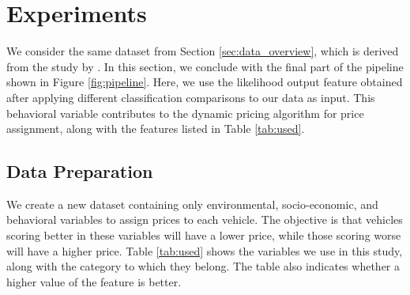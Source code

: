 \documentclass[12pt]{book}
\begin{document}


\section{Experiments}

We consider the same dataset from Section \ref{sec:data_overview}, which is derived from the study by \cite{duran_lopez_2024}. In this section, we conclude with the final part of the pipeline shown in Figure \ref{fig:pipeline}. Here, we use the likelihood output feature obtained after applying different classification comparisons to our data as input. This behavioral variable contributes to the dynamic pricing algorithm for price assignment, along with the features listed in Table \ref{tab:used}.



\subsection{Data Preparation}

We create a new dataset containing only environmental, socio-economic, and behavioral variables to assign prices to each vehicle. The objective is that vehicles scoring better in these variables will have a lower price, while those scoring worse will have a higher price. Table \ref{tab:used} shows the variables we use in this study, along with the category to which they belong. The table also indicates whether a higher value of the feature is better.
\end{document}
